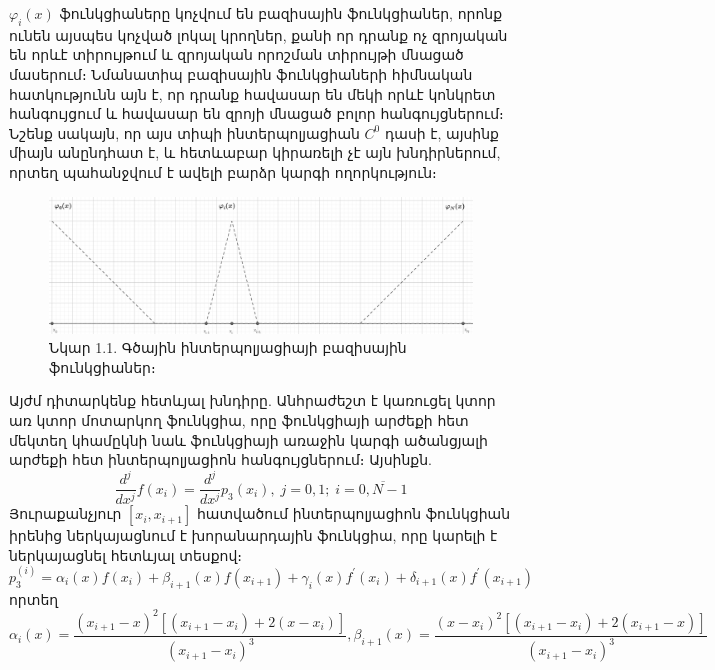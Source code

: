 \documentclass[fleqn, bachelor,subf,12pt,notitlepage]{article}
\begin{document}
$\varphi_{i}\left(x\right)$ ֆունկցիաները կոչվում են բազիսային ֆունկցիաներ, որոնք ունեն այսպես կոչված լոկալ կրողներ, քանի որ դրանք ոչ զրոյական են որևէ տիրույթում և զրոյական որոշման տիրույթի մնացած մասերում։
Նմանատիպ բազիսային ֆունկցիաների հիմնական հատկությունն այն է, որ դրանք հավասար են մեկի որևէ կոնկրետ հանգույցում և հավասար են զրոյի մնացած բոլոր հանգույցներում։ Նշենք սակայն, որ այս տիպի ինտերպոլյացիան $C^{0}$ դասի է, այսինք միայն անընդհատ է, և հետևաբար կիրառելի չէ այն խնդիրներում, որտեղ պահանջվում է ավելի բարձր կարգի ողորկություն։

\begin{figure}[h!]
\centering
\includegraphics[width=1.0\textwidth]{images/one_var_linear}
\captionsetup{labelformat=empty}
\caption{\hfill Նկար 1.1. Գծային ինտերպոլյացիայի բազիսային ֆունկցիաներ։}
\end{figure}


\newpage

Այժմ դիտարկենք հետևյալ խնդիրը.
Անհրաժեշտ է կառուցել  կտոր առ կտոր մոտարկող ֆունկցիա, որը ֆունկցիայի արժեքի հետ մեկտեղ կհամըկնի նաև ֆունկցիայի առաջին կարգի ածանցյալի արժեքի հետ ինտերպոլյացիոն հանգույցներում։ Այսինքն.
\begin{equation}
\dfrac{d^{j}}{dx^j}f(x_{i})=\dfrac{d^{j}}{dx^j}p_{3}(x_{i}),   \; j=0, 1;  \; i=\overline{0, N-1}
\end{equation}
Յուրաքանչյուր $\left[x_{i}, x_{i+1}\right]$ հատվածում ինտերպոլյացիոն ֆունկցիան իրենից ներկայացնում է խորանարդային ֆունկցիա, որը կարելի է ներկայացնել հետևյալ տեսքով։
\begin{equation}
p_{3}^{\left(i\right)} = \alpha_{i}(x)f(x_{i})+\beta_{i+1}(x)f(x_{i+1})+\gamma_{i}(x)f^{'}(x_{i})+\delta_{i+1}(x)f^{'}(x_{i+1})
\end{equation}
որտեղ 
\begin{equation}
\alpha_{i}(x)=\dfrac{\left(x_{i+1}-x\right)^{2}\left[\left(x_{i+1}-x_{i}\right)+2\left(x-x_{i}\right)\right]}{\left(x_{i+1}-x_{i}\right)^{3}}, \beta_{i+1}(x)=\dfrac{\left(x-x_{i}\right)^{2}\left[\left(x_{i+1}-x_{i}\right)+2\left(x_{i+1}-x\right)\right]}{\left(x_{i+1}-x_{i}\right)^{3}}
\end{equation}
\end{document}
